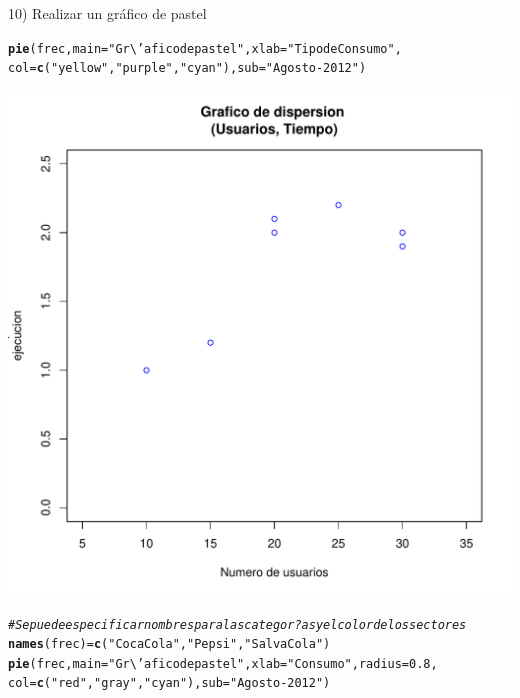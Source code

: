 \documentclass[12pt,letterpaper]{article}\usepackage[]{graphicx}\usepackage[]{color}
\makeatletter
\def\maxwidth{ %
  \ifdim\Gin@nat@width>\linewidth
    \linewidth
  \else
    \Gin@nat@width
  \fi
}
\newcommand{\hlnum}[1]{\textcolor[rgb]{0.686,0.059,0.569}{#1}}%
\newcommand{\hlstr}[1]{\textcolor[rgb]{0.192,0.494,0.8}{#1}}%
\newcommand{\hlcom}[1]{\textcolor[rgb]{0.678,0.584,0.686}{\textit{#1}}}%
\newcommand{\hlstd}[1]{\textcolor[rgb]{0.345,0.345,0.345}{#1}}%
\newcommand{\hlkwb}[1]{\textcolor[rgb]{0.69,0.353,0.396}{#1}}%
\newcommand{\hlkwc}[1]{\textcolor[rgb]{0.333,0.667,0.333}{#1}}%
\newcommand{\hlkwd}[1]{\textcolor[rgb]{0.737,0.353,0.396}{\textbf{#1}}}%
\newenvironment{kframe}{%
 \def\at@end@of@kframe{}%
 \ifinner\ifhmode%
  \def\at@end@of@kframe{\end{minipage}}%
  \begin{minipage}{\columnwidth}%
 \fi\fi%
 \def\FrameCommand##1{\hskip\@totalleftmargin \hskip-\fboxsep
 \colorbox{shadecolor}{##1}\hskip-\fboxsep
     \hskip-\linewidth \hskip-\@totalleftmargin \hskip\columnwidth}%
 \MakeFramed {\advance\hsize-\width
   \@totalleftmargin\z@ \linewidth\hsize
   \@setminipage}}%
 {\par\unskip\endMakeFramed%
 \at@end@of@kframe}
\newenvironment{knitrout}{}{} %
\makeatother
\begin{document}
10) Realizar un gr\'afico de pastel
\begin{knitrout}
\color{fgcolor}\begin{kframe}
\begin{alltt}
\hlkwd{pie}\hlstd{(frec,} \hlkwc{main}\hlstd{=}\hlstr{"Gr\textbackslash{}'afico de pastel"}\hlstd{,} \hlkwc{xlab}\hlstd{=}\hlstr{"Tipo de Consumo"}\hlstd{,}
    \hlkwc{col}\hlstd{=}\hlkwd{c}\hlstd{(}\hlstr{"yellow"}\hlstd{,} \hlstr{"purple"}\hlstd{,}\hlstr{"cyan"}\hlstd{),} \hlkwc{sub}\hlstd{=}\hlstr{"Agosto-2012"}\hlstd{)}
\end{alltt}
\end{kframe}
\includegraphics[width=\maxwidth]{figure/unnamed-chunk-9-1} 
\begin{kframe}\begin{alltt}
\hlcom{# Se puede especificar nombres para las categor?as y el color de los sectores}
\hlkwd{names}\hlstd{(frec)} \hlkwb{=} \hlkwd{c}\hlstd{(}\hlstr{"Coca Cola"}\hlstd{,} \hlstr{"Pepsi"}\hlstd{,} \hlstr{"Salva Cola"}\hlstd{)}
\hlkwd{pie}\hlstd{(frec,} \hlkwc{main}\hlstd{=}\hlstr{"Gr\textbackslash{}'afico de pastel"}\hlstd{,} \hlkwc{xlab}\hlstd{=}\hlstr{" Consumo"}\hlstd{,} \hlkwc{radius}\hlstd{=}\hlnum{0.8}\hlstd{,}
    \hlkwc{col}\hlstd{=}\hlkwd{c}\hlstd{(}\hlstr{"red"}\hlstd{,} \hlstr{"gray"}\hlstd{,}\hlstr{"cyan"}\hlstd{),} \hlkwc{sub}\hlstd{=}\hlstr{"Agosto-2012"}\hlstd{)}

\end{alltt}
\end{kframe}
\end{knitrout}
\end{document}
